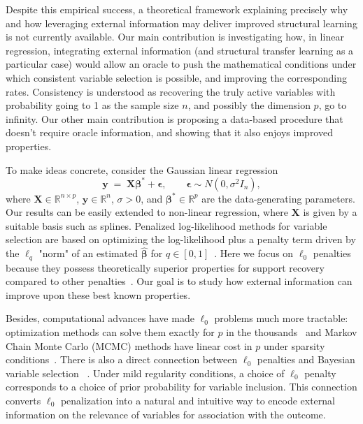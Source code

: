 \documentclass[
  12pt]{article}
\newcommand{\R}{\mathbb{R}}
\newcommand{\by}{\mathbf{y}}
\newcommand{\bbeta}{\boldsymbol{\beta}}
\newcommand{\bepsilon}{\mathbf{\epsilon}}
\newcommand{\bX}{\mathbf{X}}
\begin{document}
Despite this empirical success, a theoretical framework explaining precisely why and how leveraging external information may deliver improved structural learning is not currently available. 
Our main contribution is investigating how, in linear regression, integrating external information (and structural transfer learning as a particular case) would allow an oracle to push the mathematical conditions under which consistent variable selection is possible, and improving the corresponding rates. Consistency is understood as recovering the truly active variables with probability going to 1 as the sample size $n$, and possibly the dimension $p$, go to infinity. 
Our other main contribution is proposing a data-based procedure that doesn't require oracle information, and showing that it also enjoys improved properties.

To make ideas concrete, consider the Gaussian linear regression
\begin{equation}\label{eq:linearmodel}
	\by \;=\; \bX \bbeta^* + \bepsilon,\qquad \bepsilon \sim N(0,\sigma^2 I_n),
\end{equation}
where $\bX\in \R^{n\times p}$, $\by\in \R^n$, $\sigma >0$, and $\bbeta^* \in \mathbb{R}^p$ are the data-generating parameters. Our results can be easily  extended to non-linear regression, where $\bX$ is given by a suitable basis such as splines. 
Penalized log-likelihood methods for variable selection are based on optimizing the log-likelihood plus a penalty term driven by the $\ell_q$ "norm" of an estimated $\hat{\bbeta}$ for $q\in [0,1]$~\citep{lasso,bertsimas}. Here we focus on $\ell_0$ penalties because they possess theoretically superior properties for support recovery compared to other penalties~\citep{infotheowainwright, gao2025optimalityl0}. Our goal is to study how external information can improve upon these best known properties. 

Besides, computational advances have made $\ell_0$ problems much more tractable: optimization methods can solve them exactly for $p$ in the thousands~\citep{bertsimas2020sparse} and Markov Chain Monte Carlo (MCMC) methods have linear cost in $p$ under sparsity conditions~\citep{Yang2016,zhou2022}. There is also a direct connection between $\ell_0$ penalties and Bayesian variable selection ~\citep{BIC,EBIC,rossell2022concentration}. Under mild regularity conditions, a choice of $\ell_0$ penalty corresponds to a choice of prior probability for variable inclusion. This connection converts $\ell_0$ penalization into a natural and intuitive way to encode external information on the relevance of variables for association with the outcome. 
\end{document}

